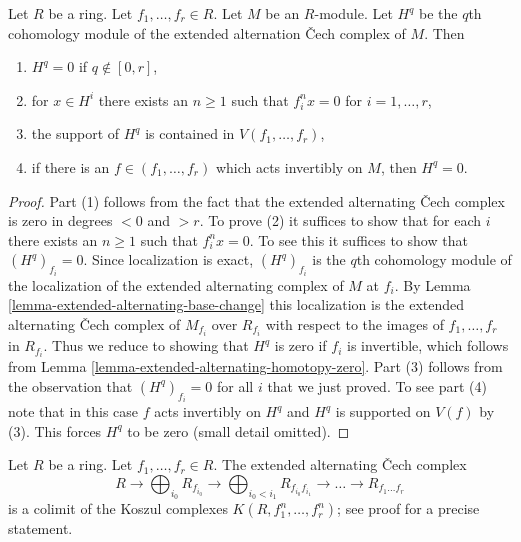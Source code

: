 \begin{lemma}
\label{lemma-extended-alternating-torsion}
Let $R$ be a ring. Let $f_1, \ldots, f_r \in R$. Let $M$ be an $R$-module.
Let $H^q$ be the $q$th cohomology module of the extended alternation
{\v C}ech complex of $M$. Then
\begin{enumerate}
\item $H^q = 0$ if $q \not \in [0, r]$,
\item for $x \in H^i$ there exists an $n \geq 1$ such that $f_i^n x = 0$
for $i = 1, \ldots, r$,
\item the support of $H^q$ is contained in $V(f_1, \ldots, f_r)$,
\item if there is an $f \in (f_1, \ldots, f_r)$ which acts invertibly
on $M$, then $H^q = 0$.
\end{enumerate}
\end{lemma}

\begin{proof}
Part (1) follows from the fact that the extended alternating {\v C}ech complex
is zero in degrees $< 0$ and $> r$. To prove (2) it suffices to show that
for each $i$ there exists an $n \geq 1$ such that $f_i^n x = 0$. To see
this it suffices to show that $(H^q)_{f_i} = 0$. Since localization is
exact, $(H^q)_{f_i}$ is the $q$th cohomology module of the localization
of the extended alternating complex of $M$ at $f_i$. By
Lemma \ref{lemma-extended-alternating-base-change}
this localization is the extended alternating {\v C}ech complex
of $M_{f_i}$ over $R_{f_i}$ with respect to the images of
$f_1, \ldots, f_r$ in $R_{f_i}$. Thus
we reduce to showing that $H^q$ is zero if $f_i$ is invertible, which
follows from Lemma \ref{lemma-extended-alternating-homotopy-zero}.
Part (3) follows from the observation that $(H^q)_{f_i} = 0$
for all $i$ that we just proved. To see part (4) note that in this
case $f$ acts invertibly on $H^q$ and $H^q$ is supported on $V(f)$
by (3). This forces $H^q$ to be zero (small detail omitted).
\end{proof}

\begin{lemma}
\label{lemma-extended-alternating-Cech-is-colimit-koszul}
Let $R$ be a ring. Let $f_1, \ldots, f_r \in R$. The extended alternating
{\v C}ech complex
$$
R \to \bigoplus\nolimits_{i_0} R_{f_{i_0}} \to
\bigoplus\nolimits_{i_0 < i_1} R_{f_{i_0}f_{i_1}} \to
\ldots \to R_{f_1\ldots f_r}
$$
is a colimit of the Koszul complexes $K(R, f_1^n, \ldots, f_r^n)$; see
proof for a precise statement.
\end{lemma}

